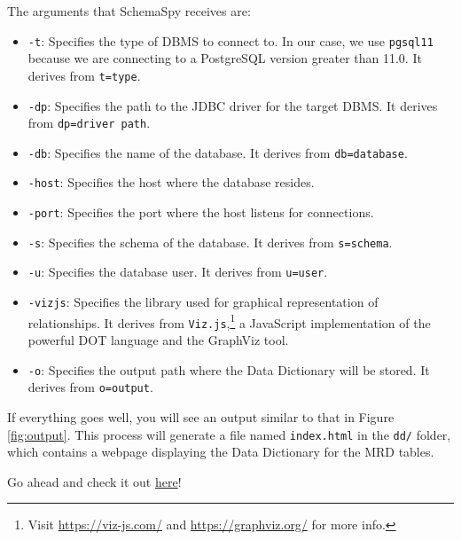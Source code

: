 \documentclass{article}
\begin{document}
\begin{enumerate}
    The arguments that SchemaSpy receives are:

    \begin{itemize}
        \item \texttt{-t}: Specifies the type of DBMS to connect to. In our case, we use \texttt{pgsql11} because we are connecting to a PostgreSQL version greater than 11.0. It derives from \texttt{t=type}.
        \item \texttt{-dp}: Specifies the path to the JDBC driver for the target DBMS. It derives from \texttt{dp=driver path}.
        \item \texttt{-db}: Specifies the name of the database. It derives from \texttt{db=database}.
        \item \texttt{-host}: Specifies the host where the database resides.
        \item \texttt{-port}: Specifies the port where the host listens for connections.
        \item \texttt{-s}: Specifies the schema of the database. It derives from \texttt{s=schema}.
        \item \texttt{-u}: Specifies the database user. It derives from \texttt{u=user}.
        \item \texttt{-vizjs}: Specifies the library used for graphical representation of relationships. It derives from \texttt{Viz.js},\footnote{Visit \url{https://viz-js.com/} and \url{https://graphviz.org/} for more info.} a JavaScript implementation of the powerful DOT language and the GraphViz tool.
        \item \texttt{-o}: Specifies the output path where the Data Dictionary will be stored. It derives from \texttt{o=output}.
    \end{itemize}

    If everything goes well, you will see an output similar to that in Figure \ref{fig:output}. This process will generate a file named \texttt{index.html} in the \texttt{dd/} folder, which contains a webpage displaying the Data Dictionary for the MRD tables.

    Go ahead and check it out \href{https://drive.google.com/file/d/1G1jscTorZTIrQgMYdCXcrxWZU75dsNVt/view?usp=sharing}{here}!


\end{enumerate}
\end{document}
